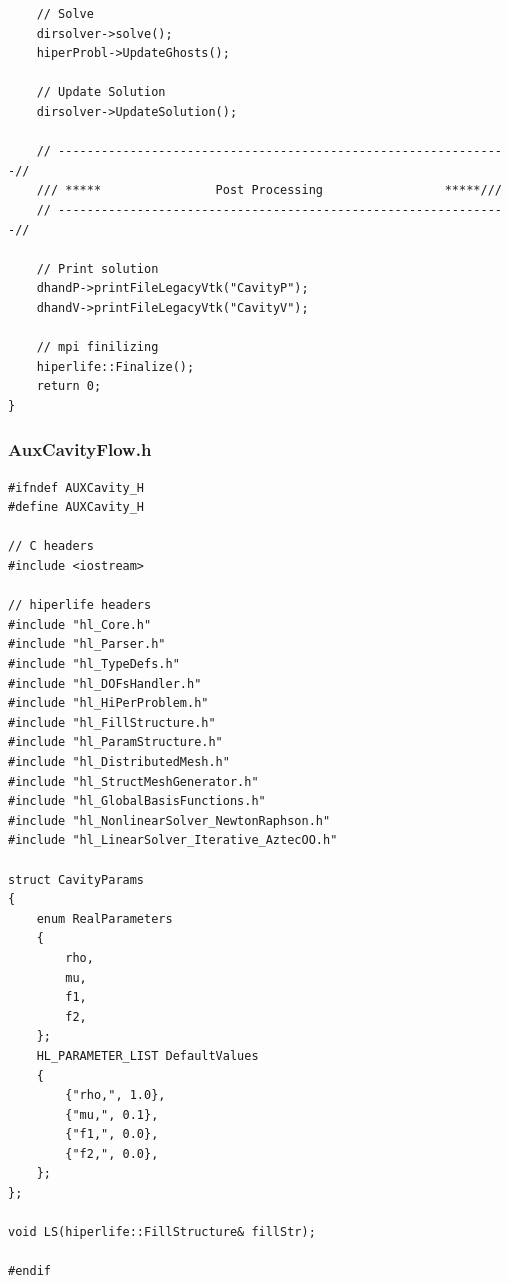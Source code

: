 \documentclass[]{article}
\begin{document}
\begin{lstlisting}
	// Solve
	dirsolver->solve();
	hiperProbl->UpdateGhosts();
		
	// Update Solution
	dirsolver->UpdateSolution();
	
	// ---------------------------------------------------------------//
	/// *****                Post Processing                 *****///
	// ---------------------------------------------------------------//
	
	// Print solution
	dhandP->printFileLegacyVtk("CavityP");
	dhandV->printFileLegacyVtk("CavityV");
	
	// mpi finilizing
	hiperlife::Finalize();
	return 0;
}
\end{lstlisting}
\subsubsection{AuxCavityFlow.h} \label{sec: a.h}
\begin{lstlisting}
#ifndef AUXCavity_H
#define AUXCavity_H

// C headers
#include <iostream>

// hiperlife headers
#include "hl_Core.h"
#include "hl_Parser.h"
#include "hl_TypeDefs.h"  
#include "hl_DOFsHandler.h"
#include "hl_HiPerProblem.h"
#include "hl_FillStructure.h"
#include "hl_ParamStructure.h"
#include "hl_DistributedMesh.h" 
#include "hl_StructMeshGenerator.h" 
#include "hl_GlobalBasisFunctions.h"
#include "hl_NonlinearSolver_NewtonRaphson.h"
#include "hl_LinearSolver_Iterative_AztecOO.h"

struct CavityParams
{
	enum RealParameters
	{
		rho,
		mu,
		f1,
		f2,
	};
	HL_PARAMETER_LIST DefaultValues
	{
		{"rho,", 1.0},
		{"mu,", 0.1},
		{"f1,", 0.0},
		{"f2,", 0.0},
	};
};

void LS(hiperlife::FillStructure& fillStr);

#endif

\end{lstlisting}
\end{document}

